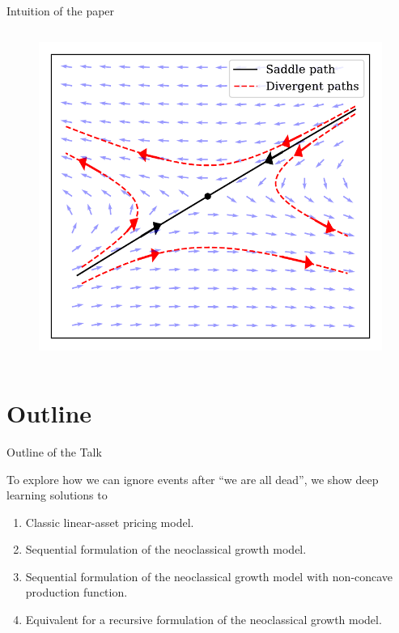 \documentclass[aspectratio=169,10pt]{beamer}
\begin{document}
\begin{frame}{Intuition of the paper}
\begin{columns}
\begin{column}{0.5\textwidth}
\begin{figure}[t!]
			\includegraphics[width=\textwidth]{figs/saddle_path.pdf}
			\vspace{-7mm}
		\end{figure}
		\end{column}
	\end{columns}
\end{frame}

\section{Outline}

\begin{frame}{Outline of the Talk}
	
	To explore how we can ignore events after ``we are all dead'', we show deep learning solutions to
	\begin{enumerate}
		\item Classic linear-asset pricing model.\vspace{0.1in}
		\item Sequential formulation of the neoclassical growth model.\vspace{0.1in}
		\item Sequential formulation of the neoclassical growth model with non-concave production function.\vspace{0.1in}
		\item Equivalent for a recursive formulation of the neoclassical growth model.\vspace{0.1in}
		
	\end{enumerate}
\end{frame}
\end{document}
